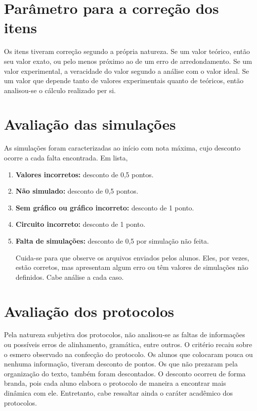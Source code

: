 \documentclass[10pt]{article}
\begin{document}
\section{Parâmetro para a correção dos itens}
Os itens tiveram correção segundo a própria natureza. Se um valor teórico, então seu valor exato, ou pelo menos próximo ao de um erro de arredondamento. Se um valor experimental, a veracidade do valor segundo a análise com o valor ideal. Se um valor que depende tanto de valores experimentais quanto de teóricos, então analisou-se o cálculo realizado per si.

\section{Avaliação das simulações}
	As simulações foram caracterizadas ao início com nota máxima, cujo desconto ocorre a cada falta encontrada. Em lista,
	
	\begin{enumerate}
		\item \textbf{Valores incorretos:} desconto de 0,5 pontos.
		\item \textbf{Não simulado:} desconto de 0,5 pontos.
		\item \textbf{Sem gráfico ou gráfico incorreto:} desconto de 1 ponto.
		\item \textbf{Circuito incorreto:} desconto de 1 ponto.
		\item \textbf{Falta de simulações:} desconto de 0,5 por simulação não feita.
		
		Cuida-se para que observe os arquivos enviados pelos alunos. Eles, por vezes, estão corretos, mas apresentam algum erro ou têm valores de simulações não definidos. Cabe análise a cada caso.
	\end{enumerate}
	
\section{Avaliação dos protocolos}
	
	Pela natureza subjetiva dos protocolos, não analisou-se as faltas de informações ou possíveis erros de alinhamento, gramática, entre outros. O critério recaiu sobre o esmero observado na confecção do protocolo. Os alunos que colocaram pouca ou nenhuma informação, tiveram desconto de pontos. Os que não prezaram pela organização do texto, também foram descontados. O desconto ocorreu de forma branda, pois cada aluno elabora o protocolo de maneira a encontrar mais dinâmica com ele. Entretanto, cabe ressaltar ainda o caráter acadêmico dos protocolos.
\end{document}
